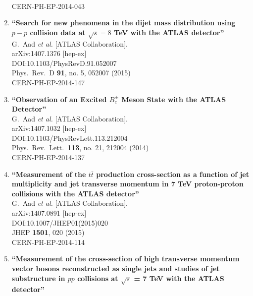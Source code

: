 \documentclass{article}
\begin{document}
\begin{enumerate}
  \\{}CERN-PH-EP-2014-043
\item%
{\bf ``Search for new phenomena in the dijet mass distribution using $p-p$ collision data at $\sqrt{s}=8$ TeV with the ATLAS detector''}
  \\{}G.~Aad {\it et al.} [ATLAS Collaboration].
  \\{}arXiv:1407.1376 [hep-ex]
  \\{}DOI:10.1103/PhysRevD.91.052007
  \\{}Phys.\ Rev.\ D {\bf 91}, no. 5, 052007 (2015)
  \\{}CERN-PH-EP-2014-147
\item%
{\bf ``Observation of an Excited $B_c^\pm$ Meson State with the ATLAS Detector''}
  \\{}G.~Aad {\it et al.} [ATLAS Collaboration].
  \\{}arXiv:1407.1032 [hep-ex]
  \\{}DOI:10.1103/PhysRevLett.113.212004
  \\{}Phys.\ Rev.\ Lett.\  {\bf 113}, no. 21, 212004 (2014)
  \\{}CERN-PH-EP-2014-137
\item%
{\bf ``Measurement of the $ t\overline{t} $ production cross-section as a function of jet multiplicity and jet transverse momentum in 7 TeV proton-proton collisions with the ATLAS detector''}
  \\{}G.~Aad {\it et al.} [ATLAS Collaboration].
  \\{}arXiv:1407.0891 [hep-ex]
  \\{}DOI:10.1007/JHEP01(2015)020
  \\{}JHEP {\bf 1501}, 020 (2015)
  \\{}CERN-PH-EP-2014-114
\item%
{\bf ``Measurement of the cross-section of high transverse momentum vector bosons reconstructed as single jets and studies of jet substructure in $pp$ collisions at ${\sqrt{s}}$ = 7 TeV with the ATLAS detector''}

\end{enumerate}
\end{document}
